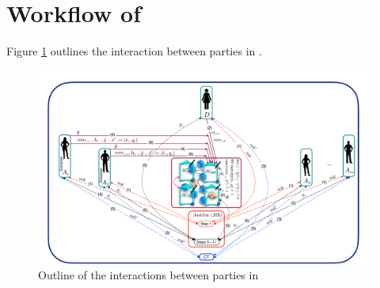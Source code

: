 


\section{Workflow of \withRew}\label{sec::Workflow-of-withRew}


Figure \ref{fig:parties-interactions-in-ANE} outlines the interaction between parties in \withRew.

\vs
\vs
\begin{figure}[htp]
    \centering
    \includegraphics[width=12.7cm]{Diag-2.pdf}
    \caption{Outline of the interactions between parties in \withRew}\label{fig:parties-interactions-in-ANE}
\end{figure}

